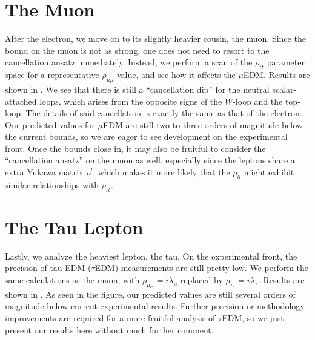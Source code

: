 \section{The Muon}
After the electron, we move on to its slightly heavier cousin, the muon. 
Since the bound on the muon is not as strong, one does not need to resort to the cancellation ansatz immediately.
Instead, we perform a scan of the \(\rho_{tt} \) parameter space for a representative \(\rho_{\mu\mu} \) value, and see how it affects the \(\mu \)EDM.
Results are shown in .
We see that there is still a ``cancellation dip'' for the neutral scalar-attached loops, which arises from the opposite signs of the \(W \)-loop and the top-loop.
The details of said cancellation is exactly the same as that of the electron.
Our predicted values for \(\mu \)EDM are still two to three orders of magnitude below the current bounds, so we are eager to see development on the experimental front.
Once the bounds close in, it may also be fruitful to consider the ``cancellation ansatz'' on the muon as well, especially since the leptons share a extra Yukawa matrix \(\rho^{l} \),
which makes it more likely that the \(\rho_{ll} \) might exhibit similar relationships with \(\rho_{tt} \).

\section{The Tau Lepton}
Lastly, we analyze the heaviest lepton, the tau.
On the experimental front, the precision of tau EDM (\(\tau \)EDM) measurements are still pretty low.
We perform the same calculations as the muon, with \(\rho_{\mu\mu} = i\lambda_{\mu} \) replaced by \(\rho_{\tau\tau} = i\lambda_{\tau} \).
Results are shown in .
As seen in the figure, our predicted values are still several orders of magnitude below current experimental results.
Further precision or methodology improvements are required for a more fruitful analysis of \(\tau \)EDM, so we just present our results here without much further comment.

\clearpage
